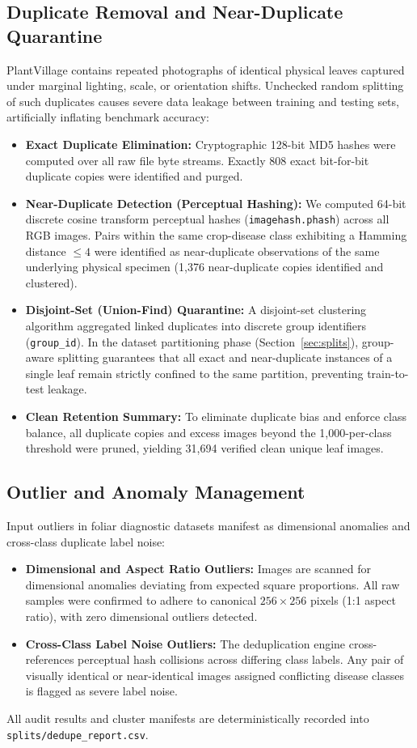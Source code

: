 \subsection{Duplicate Removal and Near-Duplicate Quarantine}
PlantVillage contains repeated photographs of identical physical leaves captured under marginal lighting, scale, or orientation shifts. Unchecked random splitting of such duplicates causes severe data leakage between training and testing sets, artificially inflating benchmark accuracy:
\begin{itemize}
    \item \textbf{Exact Duplicate Elimination:} Cryptographic 128-bit MD5 hashes were computed over all raw file byte streams. Exactly 808 exact bit-for-bit duplicate copies were identified and purged.
    \item \textbf{Near-Duplicate Detection (Perceptual Hashing):} We computed 64-bit discrete cosine transform perceptual hashes (\texttt{imagehash.phash}) across all RGB images. Pairs within the same crop-disease class exhibiting a Hamming distance $\le 4$ were identified as near-duplicate observations of the same underlying physical specimen (1,376 near-duplicate copies identified and clustered).
    \item \textbf{Disjoint-Set (Union-Find) Quarantine:} A disjoint-set clustering algorithm aggregated linked duplicates into discrete group identifiers (\texttt{group\_id}). In the dataset partitioning phase (Section~\ref{sec:splits}), group-aware splitting guarantees that all exact and near-duplicate instances of a single leaf remain strictly confined to the same partition, preventing train-to-test leakage.
    \item \textbf{Clean Retention Summary:} To eliminate duplicate bias and enforce class balance, all duplicate copies and excess images beyond the 1,000-per-class threshold were pruned, yielding 31,694 verified clean unique leaf images.
\end{itemize}

\subsection{Outlier and Anomaly Management}
Input outliers in foliar diagnostic datasets manifest as dimensional anomalies and cross-class duplicate label noise:
\begin{itemize}
    \item \textbf{Dimensional and Aspect Ratio Outliers:} Images are scanned for dimensional anomalies deviating from expected square proportions. All raw samples were confirmed to adhere to canonical $256 \times 256$ pixels (1:1 aspect ratio), with zero dimensional outliers detected.
    \item \textbf{Cross-Class Label Noise Outliers:} The deduplication engine cross-references perceptual hash collisions across differing class labels. Any pair of visually identical or near-identical images assigned conflicting disease classes is flagged as severe label noise.
\end{itemize}

All audit results and cluster manifests are deterministically recorded into \texttt{splits/dedupe\_report.csv}.
